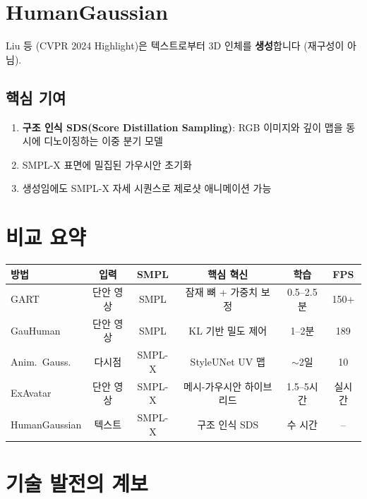 \documentclass[11pt, a4paper]{report}
\begin{document}
\section{HumanGaussian}

Liu 등 (CVPR 2024 Highlight)은 텍스트로부터 3D 인체를 \textbf{생성}합니다 (재구성이 아님).

\subsection{핵심 기여}

\begin{enumerate}[leftmargin=*]
  \item \textbf{구조 인식 SDS(Score Distillation Sampling)}: RGB 이미지와 깊이 맵을 동시에 디노이징하는 이중 분기 모델
  \item SMPL-X 표면에 밀집된 가우시안 초기화
  \item 생성임에도 SMPL-X 자세 시퀀스로 제로샷 애니메이션 가능
\end{enumerate}


\section{비교 요약}

\begin{center}
\renewcommand{\arraystretch}{1.3}
\small
\begin{tabular}{lccccc}
\toprule
\textbf{방법} & \textbf{입력} & \textbf{SMPL} & \textbf{핵심 혁신} & \textbf{학습} & \textbf{FPS} \\
\midrule
GART & 단안 영상 & SMPL & 잠재 뼈 + 가중치 보정 & 0.5--2.5분 & 150+ \\
GauHuman & 단안 영상 & SMPL & KL 기반 밀도 제어 & 1--2분 & 189 \\
Anim.\ Gauss. & 다시점 & SMPL-X & StyleUNet UV 맵 & $\sim$2일 & 10 \\
ExAvatar & 단안 영상 & SMPL-X & 메시-가우시안 하이브리드 & 1.5--5시간 & 실시간 \\
HumanGaussian & 텍스트 & SMPL-X & 구조 인식 SDS & 수 시간 & -- \\
\bottomrule
\end{tabular}
\end{center}


\section{기술 발전의 계보}
\end{document}
